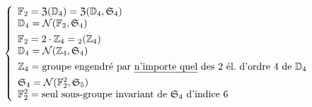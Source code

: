 \documentclass[11pt,a4paper]{article}
\begin{document}
\[
  \left\lbrace
  \begin{array}{l}
    \mathbb{F}_2 = \mathfrak{Z}(\mathbb{D}_4) = \mathfrak{Z}(\mathbb{D}_4, \mathfrak{S}_4) \\
    \mathbb{D}_4 = \mathcal{N}(\mathbb{F}_2, \mathfrak{S}_4) \\[4pt]
    \mathbb{F}_2 = 2\cdot\mathbb{Z}_4 = {}_2(\mathbb{Z}_4) \\
    \mathbb{D}_4 = \mathcal{N}(\mathbb{Z}_4, \mathfrak{S}_4) \\[4pt]
    \mathbb{Z}_4 = \text{groupe engendré par \uncertain{n'importe quel} des 2 él.\ d'ordre 4 de } \mathbb{D}_4 \\[4pt]
    \mathfrak{S}_4 = \mathcal{N}(\mathbb{F}_2^{2}, \mathfrak{S}_5) \\
    \mathbb{F}_2^{2} = \text{seul sous-groupe invariant de } \mathfrak{S}_4 \text{ d'indice } 6
  \end{array}
  \right.
\]
\end{document}
